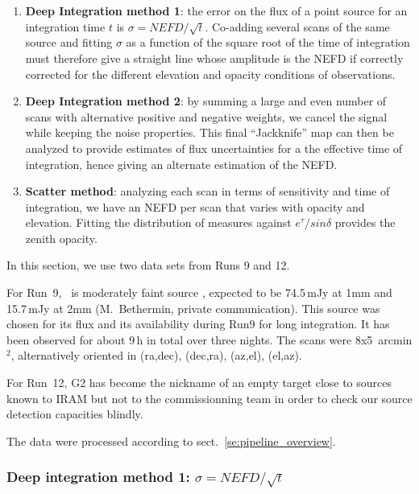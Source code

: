 \begin{enumerate}
\item {\bf Deep Integration method 1}: the error on the flux of a point source for an
  integration time $t$ is $\sigma = NEFD/\sqrt{t}$. Co-adding several scans of
  the same source and fitting $\sigma$ as a function of the square root of the
  time of integration must therefore give a straight line whose
  amplitude is the NEFD if correctly corrected for the different elevation and
  opacity conditions of observations.
\item {\bf Deep Integration method 2}: by summing a large and even number of scans
  with alternative positive and negative weights, we cancel the signal while
  keeping the noise properties. This final ``Jackknife'' map can then be analyzed
  to provide estimates of flux uncertainties for a the effective time of
  integration, hence giving an alternate estimation of the NEFD.
\item {\bf Scatter method}: analyzing each scan in terms of sensitivity and
  time of integration, we have an NEFD per scan that varies with opacity and
  elevation. Fitting the distribution of measures against $e^\tau/sin\delta$
  provides the zenith opacity.
\end{enumerate}

In this section, we use two data sets from Runs 9 and 12.

For Run~9, \hls\ is moderately faint source \cite{hls_combes}, expected to be
74.5\,mJy at 1mm and 15.7\,mJy at 2mm (M.~Bethermin, private
communication). This source was chosen for its flux and its availability during
Run9 for long integration. It has been observed for about 9\,h in total over
three nights. The scans were 8x5~arcmin$^2$, alternatively oriented in (ra,dec),
(dec,ra), (az,el), (el,az).

For Run~12, G2 has become the nickname of an empty target close to sources known
to IRAM but not to the commissionning team in order to check our source
detection capacities blindly.

The data were processed according to sect.~\ref{se:pipeline_overview}.

\subsubsection{Deep integration method 1: $\sigma = NEFD/\sqrt{t}$}


